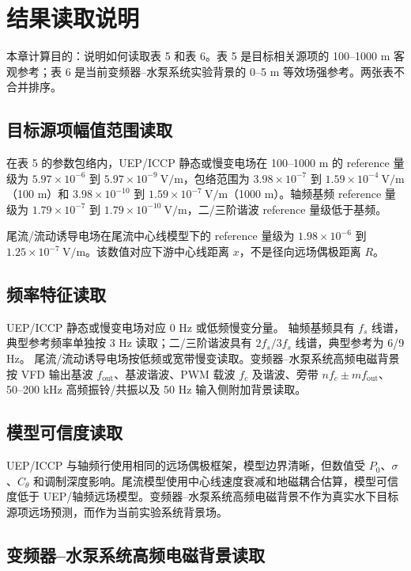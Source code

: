 \section{结果读取说明}

本章计算目的：说明如何读取表 5 和表 6。表 5 是目标相关源项的 100--1000 m 客观参考；表 6 是当前变频器--水泵系统实验背景的 0--5 m 等效场强参考。两张表不合并排序。

\subsection{目标源项幅值范围读取}

在表 5 的参数包络内，UEP/ICCP 静态或慢变电场在 100--1000 m 的 reference 量级为 $5.97\times10^{-6}$ 到 $5.97\times10^{-9}\ \mathrm{V/m}$，包络范围为 $3.98\times10^{-7}$ 到 $1.59\times10^{-4}\ \mathrm{V/m}$（100 m）和 $3.98\times10^{-10}$ 到 $1.59\times10^{-7}\ \mathrm{V/m}$（1000 m）。轴频基频 reference 量级为 $1.79\times10^{-7}$ 到 $1.79\times10^{-10}\ \mathrm{V/m}$，二/三阶谐波 reference 量级低于基频。

尾流/流动诱导电场在尾流中心线模型下的 reference 量级为 $1.98\times10^{-6}$ 到 $1.25\times10^{-7}\ \mathrm{V/m}$。该数值对应下游中心线距离 $x$，不是径向远场偶极距离 $R$。

\subsection{频率特征读取}

UEP/ICCP 静态或慢变电场对应 0 Hz 或低频慢变分量。
轴频基频具有 $f_s$ 线谱，典型参考频率单独按 3 Hz 读取；二/三阶谐波具有 $2f_s/3f_s$ 线谱，典型参考为 6/9 Hz。
尾流/流动诱导电场按低频或宽带慢变读取。变频器--水泵系统高频电磁背景按 VFD 输出基波 $f_{\mathrm{out}}$、基波谐波、PWM 载波 $f_c$ 及谐波、旁带 $nf_c\pm mf_{\mathrm{out}}$、50--200 kHz 高频振铃/共振以及 50 Hz 输入侧附加背景读取。

\subsection{模型可信度读取}

UEP/ICCP 与轴频行使用相同的远场偶极框架，模型边界清晰，但数值受 $P_0$、$\sigma$、$C_\theta$ 和调制深度影响。尾流模型使用中心线速度衰减和地磁耦合估算，模型可信度低于 UEP/轴频远场模型。变频器--水泵系统高频电磁背景不作为真实水下目标源项远场预测，而作为当前实验系统背景场。

\subsection{变频器--水泵系统高频电磁背景读取}

